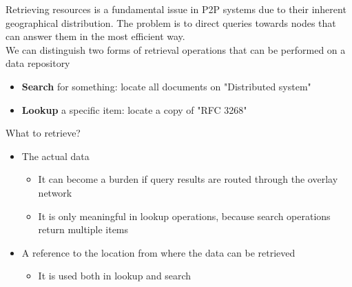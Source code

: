 \documentclass[10pt,a4paper]{article}
\begin{document}
Retrieving resources is a fundamental issue in P2P systems due to their inherent geographical distribution. The problem is to direct queries towards nodes that can answer them in the most efficient way. \\
We can distinguish two forms of retrieval operations that can be performed on a data repository
\begin{itemize}
	\item \textbf{Search} for something: locate all documents on "Distributed system"
	\item \textbf{Lookup} a specific item: locate a copy of "RFC 3268"
\end{itemize}
What to retrieve? 
\begin{itemize}
	\item The actual data
	\begin{itemize}
		\item It can become a burden if query results are routed through the overlay network
		\item It is only meaningful in lookup operations, because search operations return multiple items
	\end{itemize}
	\item A reference to the location from where the data can be retrieved
	\begin{itemize}
		\item It is used both in lookup and search
	\end{itemize}
\end{itemize}
\end{document}
